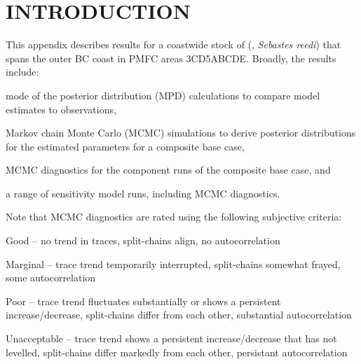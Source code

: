 \documentclass[11pt]{book}
\newcommand{\newstuff}[1]{\normalsize\textcolor{blue}{#1}\normalsize}
\begin{document}
\section{INTRODUCTION}


This appendix describes results for a coastwide stock of \SPP{} (\SPC, \emph{Sebastes reedi}) that spans the outer BC coast in PMFC areas 3CD5ABCDE.
Broadly, the results include:
\vspace{-0.5\baselineskip}%
\begin{itemize_csas}{}{}
\item mode of the posterior distribution (MPD) calculations to compare model estimates to observations, 
\item Markov chain Monte Carlo (MCMC) simulations to derive posterior distributions for the estimated parameters for a composite base case,
\item MCMC diagnostics for the component runs of the composite base case, and
\item a range of sensitivity model runs, including MCMC diagnostics.
\end{itemize_csas}
Note that MCMC diagnostics are rated using the following subjective criteria:
\begin{itemize_csas}{}{}
  \item Good -- no trend in traces, split-chains align, no autocorrelation
  \item Marginal -- trace trend temporarily interrupted, split-chains somewhat frayed, some autocorrelation
  \item Poor -- trace trend fluctuates substantially or shows a persistent increase/decrease, split-chains differ from each other, substantial autocorrelation
  \item Unacceptable -- trace trend shows a persistent increase/decrease that has not levelled, split-chains differ markedly from each other, persistant autocorrelation
\end{itemize_csas}
\end{document}

